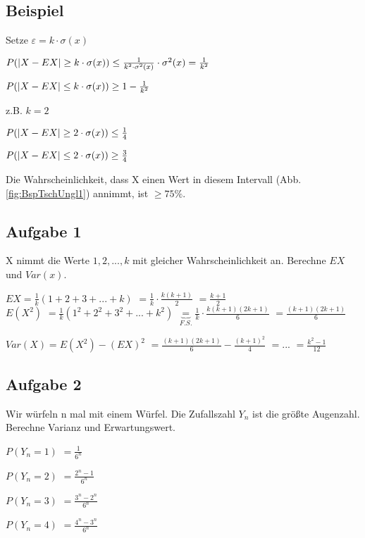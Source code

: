\subsection{Beispiel} 
Setze $\varepsilon = k \cdot \sigma(x)$

$ P( \left\vert X-EX \right\vert  \geq k\cdot \sigma(x)) \leq \frac{1}{k^2 \cdot \sigma^2(x)} \cdot \sigma^2(x) = \frac{1}{k^2}$

$ P( \left\vert X - EX \right\vert  \leq k \cdot \sigma(x)) \geq 1 - \frac{1}{k^2}$

z.B. $k=2$

$ P( \left\vert X-EX \right\vert  \geq 2\cdot \sigma(x)) \leq \frac{1}{4}$

$ P( \left\vert X - EX \right\vert  \leq 2 \cdot \sigma(x)) \geq \frac{3}{4}$

Die Wahrscheinlichkeit, dass X einen Wert in diesem Intervall (Abb. \ref{fig:BspTschUngl1}) annimmt, ist $\geq 75\% $. 

\subsection{Aufgabe 1} 
X nimmt die Werte $1,2,..., k$ mit gleicher Wahrscheinlichkeit an. Berechne $EX$ und $Var(x)$.

$EX = \frac{1}{k} (1+2+3+...+k)$
$=\frac{1}{k} \cdot  \frac{k(k+1)}{2} $
$=\frac{k+1}{2}$\\

$E(X^2) $
$=\frac{1}{k} (1^2+2^2+3^2+...+k^2)$
$\underbrace{=}_{F.S.} \frac{1}{k} \cdot \frac{k(k+1)(2k+1)}{6}$ 
$=\frac{(k+1)(2k+1)}{6}$

$Var(X) = E(X^2) - (EX)^2$
$=\frac{(k+1)(2k+1)}{6} - \frac{(k+1)^2}{4}$
$=...$
$=\frac{k^2-1}{12}$

\subsection{Aufgabe 2}
Wir würfeln n mal mit einem Würfel. Die Zufallszahl $Y_n$ ist die größte Augenzahl. Berechne Varianz und Erwartungswert.

$P(Y_n = 1) $
$=\frac{1}{6^n}$

$P(Y_n = 2) $
$=\frac{2^n - 1}{6^n}$ 

$P(Y_n = 3) $
$=\frac{3^n - 2^n}{6^n}$ 

$P(Y_n = 4) $
$=\frac{4^n - 3^n}{6^n}$

